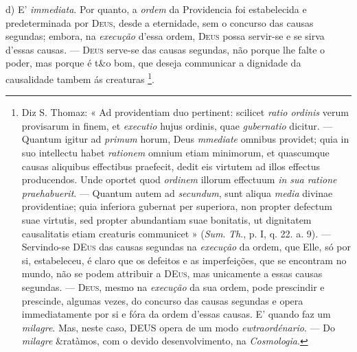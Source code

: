  d) E' \emph{immediata}. Por quanto, a \emph{ordem} da Providencia foi estabelecida e predeterminada por \textsc{Deus}, desde a eternidade, sem o concurso das causas segundas; embora, na \emph{execução} d'essa ordem, \textsc{Deus} possa servir-se e se sirva d'essas causas. --- \textsc{Deus} serve-se das causas segundas, não porque lhe falte o poder, mas porque é t\&o bom, que deseja communicar a dignidade da causalidade tambem ás creaturas \footnote{Diz S. Thomaz: « Ad providentiam duo pertinent: scilicet \emph{ratio ordinis} verum provisarum in finem, et \emph{executio} hujus ordinis, quae \emph{gubernatio} dicitur. --- Quantum igitur ad \emph{primum} horum, Deus \emph{mmediate} omnibus providet; quia in suo intellectu habet \emph{rationem} omnium etiam minimorum, et quascumque causas aliquibus effectibus praefecit, dedit eis virtutem ad illos effectus producendos. Unde oportet quod \emph{ordinem} illorum effectuum \emph{in sua ratione praehabuerit}. --- Quantum autem ad \emph{secundum}, sunt aliqua \emph{media} divinae providentiae; quia inferiora gubernat per superiora, non propter defectum suae virtutis, sed propter abundantiam suae bonitatis, ut dignitatem causalitatis etiam creaturis communicet » (\emph{Sum}. \emph{Th}., p. I, q. 22. a. 9). --- Servindo-se \textsc{DEus} das causas segundas na \emph{execução} da ordem, que Elle, só por si, estabeleceu, é claro que os defeitos e as imperfeições, que se encontram no mundo, não se podem attribuir a \textsc{DEus}, mas unicamente a essas causas segundas. --- \textsc{Deus}, mesmo na \emph{execução} da sua ordem, pode prescindir e prescinde, algumas vezes, do concurso das causas segundas e opera immediatamente por si e fóra da ordem d'essas causas. E' quando faz um \emph{milagre}. Mas, neste caso, \textsc{DEUS} opera de um modo \emph{ewtraordénario}. --- Do \emph{milagre} \&ratàmos, com o devido desenvolvimento, na \emph{Cosmologia}.}.

